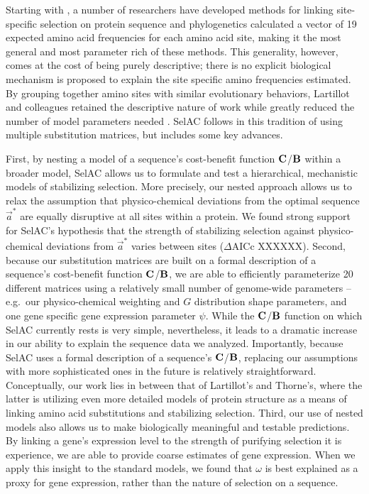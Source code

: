 \documentclass[12pt,letterpaper]{article}
\newcommand{\PC}{physico-chemical\xspace}
\newcommand{\Cost}{\ensuremath{\text{\textbf{C}}}\xspace}
\newcommand{\DeltaAICc}{\ensuremath{\Delta\text{AICc}}\xspace}
\newcommand{\Func}{\ensuremath{\text{\textbf{B}}}\xspace}
\newcommand{\selac}{SelAC\xspace}
\newcommand{\aoptvec}{\ensuremath{\Vec{a}^*}\xspace}
\begin{document}
Starting with \citet{HalpernAndBruno1998}, a number of researchers have developed methods for linking site-specific selection on protein sequence and phylogenetics\citep[e.g.~][]{KoshiEtAl1999,DimmicEtAl2000,KoshiAndGoldstein2001,RobinsonEtAl2003,LartillotAndPhilippe2004,ThorneEtAl2012,RodrigueAndLartillot2014} 
\citet{HalpernAndBruno1998} calculated  a vector of 19 expected amino acid frequencies for each amino acid site, making it the most general and most parameter rich of these methods.
This generality, however, comes at the cost of being purely descriptive; there is no explicit biological mechanism is proposed to explain the site specific amino frequencies estimated. 
By grouping together amino sites with similar evolutionary behaviors, Lartillot and colleagues retained the descriptive nature of \citet{HalpernAndBruno1998} work while greatly reduced the number of model parameters needed \citep{LartillotAndPhilippe2004,RodrigueAndLartillot2014}.
\selac follows in this tradition of using multiple substitution matrices, but includes some key advances. 

First, by nesting a model of a sequence's cost-benefit function \Cost/\Func within a broader model, \selac allows us to formulate and test a hierarchical, mechanistic models of stabilizing selection.
More precisely, our nested approach allows us to relax the assumption that \PC deviations from the optimal sequence \aoptvec are equally disruptive at all sites within a protein. 
We found strong support for \selac's hypothesis that the strength of stabilizing selection against \PC deviations from \aoptvec varies between sites (\DeltaAICc XXXXXX). 
Second, because our substitution matrices are built on a formal description of a sequence's cost-benefit function \Cost/\Func, we are able to efficiently parameterize 20 different matrices using a relatively small number of genome-wide parameters -- e.g.~our \PC weighting and $G$ distribution shape parameters, and one gene specific gene expression parameter $\psi$. 
While the \Cost/\Func function on which \selac currently rests is very simple, nevertheless, it leads to a dramatic increase in our ability to explain the sequence data we analyzed.
Importantly, because \selac uses a formal description of a sequence's \Cost/\Func,  replacing our assumptions with more sophisticated ones in the future is relatively straightforward. 
Conceptually, our work lies in between that of Lartillot's and Thorne's, where the latter is utilizing even more detailed models of protein structure as a means of linking amino acid substitutions and stabilizing selection.
Third, our use of nested models also allows us to make biologically meaningful and testable predictions. By linking a gene's expression level to the strength of purifying selection it is experience, we are able to provide coarse estimates of gene expression. When we apply this insight to the standard models, we found that $\omega$ is best explained as a proxy for gene expression, rather than the nature of selection on a sequence.
\end{document}
